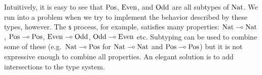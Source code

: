 \documentclass[submission,copyright,creativecommons]{eptcs}
\newcommand{\m}[1]{\mathsf{#1}}
\newcommand{\mb}[1]{\mbox{\bf #1}}
\newcommand{\semi}{\mathrel{;}}
\begin{document}

Intuitively, it is easy to see that $\pos$, $\even$, and $\odd$ are all subtypes of $\nat$. We run into a problem when we try to implement the behavior described by these types, however. The $\m{s}$ process, for example, satisfies many properties: $\nat \lolli \nat$, $\pos \lolli \pos$, $\even \lolli \odd$, $\odd \lolli \even$ etc. Subtyping can be used to combine some of these (e.g.\ $\nat \lolli \pos$ for $\nat \lolli \nat$ and $\pos \lolli \pos$) but it is not expressive enough to combine all properties. An elegant solution is to add intersections to the type system.
\end{document}
